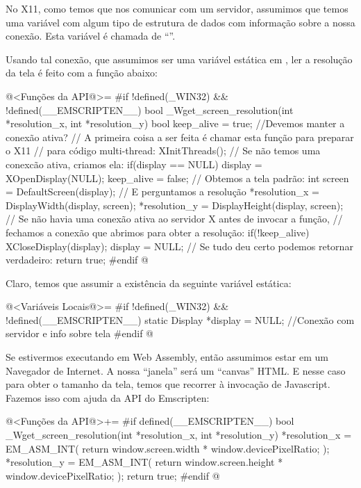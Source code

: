 No X11, como temos que nos comunicar com um servidor, assumimos que
temos uma variável com algum tipo de estrutura de dados com informação
sobre a nossa conexão. Esta variável é chamada de
``''.

Usando tal conexão, que assumimos ser uma variável estática
em , ler a resolução da tela é feito com a função
abaixo:

\iniciocodigo
@<Funções da API@>=
#if !defined(_WIN32) && !defined(__EMSCRIPTEN__)
bool _Wget_screen_resolution(int *resolution_x, int *resolution_y){
  bool keep_alive = true; //Devemos manter a conexão ativa?
  // A primeira coisa a ser feita é chamar esta função para preparar o X11
  // para código multi-thread:
  XInitThreads();
  // Se não temos uma conexcão ativa, criamos ela:
  if(display == NULL){
    display = XOpenDisplay(NULL);
    keep_alive = false;
  }
  // Obtemos a tela padrão:
  int screen = DefaultScreen(display);
  // E perguntamos a resolução
  *resolution_x = DisplayWidth(display, screen);
  *resolution_y = DisplayHeight(display, screen);
  // Se não havia uma conexão ativa ao servidor X antes de invocar a função,
  // fechamos a conexão que abrimos para obter a resolução:
  if(!keep_alive){
    XCloseDisplay(display);
    display = NULL;
  }
  // Se tudo deu certo podemos retornar verdadeiro:
  return true;
}
#endif
@
\fimcodigo

Claro, temos que assumir a existência da seguinte variável estática:

\iniciocodigo
@<Variáveis Locais@>=
#if !defined(_WIN32) && !defined(__EMSCRIPTEN__)
static Display *display = NULL; //Conexão com servidor e info sobre tela
#endif
@
\fimcodigo


Se estivermos executando em Web Assembly, então assumimos estar em um
Navegador de Internet. A nossa ``janela'' será um ``canvas'' HTML. E
nesse caso para obter o tamanho da tela, temos que recorrer à
invocação de Javascript. Fazemos isso com ajuda da API do Emscripten:

\iniciocodigo
@<Funções da API@>+=
#if defined(__EMSCRIPTEN__)
bool _Wget_screen_resolution(int *resolution_x, int *resolution_y){
  *resolution_x = EM_ASM_INT({
    return window.screen.width * window.devicePixelRatio;
  });
  *resolution_y = EM_ASM_INT({
    return window.screen.height * window.devicePixelRatio;
  });
  return true;
}
#endif
@
\fimcodigo



